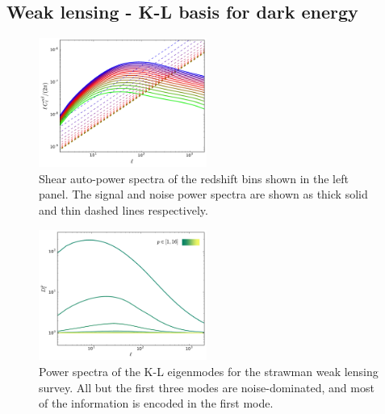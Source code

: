 \documentclass[twocolumn,amsfont,amssymb,amsmath, showpacs,balancelastpage, nofootinbib]{revtex4-1}
\begin{document}
  \subsection{Weak lensing - K-L basis for dark energy}\label{ssec:results.wl}
    \begin{figure}
      \centering
      \includegraphics[width=0.49\textwidth]{Figs/c_ij_wl}
      \caption{Shear auto-power spectra of the redshift bins shown in the left panel. The signal and noise power spectra are shown as thick solid and thin dashed lines respectively.}\label{fig:nz_wl}
    \end{figure}
    \begin{figure}
      \centering
      \includegraphics[width=0.49\textwidth]{Figs/d_p_wl}
      \caption{Power spectra of the K-L eigenmodes for the strawman weak lensing survey. All but the first three modes are noise-dominated, and most of the information is encoded in the first mode.}\label{fig:dp_wl}
    \end{figure}
\end{document}
